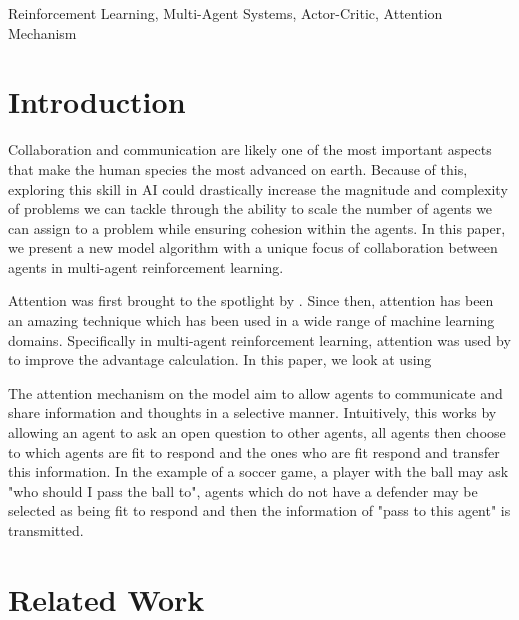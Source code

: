 \documentclass[conference]{IEEEtran}
\begin{document}
\begin{IEEEkeywords}
Reinforcement Learning, Multi-Agent Systems, Actor-Critic, Attention Mechanism
\end{IEEEkeywords}

\section{Introduction}
\noindent Collaboration and communication are likely one of the most important aspects that make the human species the most advanced on earth. Because of this, exploring this skill in AI could drastically increase the magnitude and complexity of problems we can tackle through the ability to scale the number of agents we can assign to a problem while ensuring cohesion within the agents. In this paper, we present a new model algorithm with a unique focus of collaboration between agents in multi-agent reinforcement learning.

Attention was first brought to the spotlight by \cite{attentionneed}. Since then, attention has been an amazing technique which has been used in a wide range of machine learning domains. Specifically in multi-agent reinforcement learning, attention was used by \cite{MAAC} to improve the advantage calculation. In this paper, we look at using


The attention mechanism on the model aim to allow agents to communicate and share information and thoughts in a selective manner. Intuitively, this works by allowing an agent to ask an open question to other agents, all agents then choose to which agents are fit to respond and the ones who are fit respond and transfer this information. In the example of a soccer game, a player with the ball may ask "who should I pass the ball to", agents which do not have a defender may be selected as being fit to respond and then the information of "pass to this agent" is transmitted.








\section{Related Work} %
\end{document}
